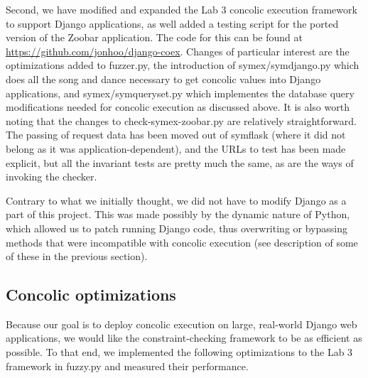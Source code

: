\documentclass{scrartcl}
\begin{document}
Second, we have modified and expanded the Lab 3 concolic execution framework to
support Django applications, as well added a testing script for the ported
version of the Zoobar application. The code for this can be found at
\url{https://github.com/jonhoo/django-coex}. Changes of particular interest are
the optimizations added to fuzzer.py, the introduction of symex/symdjango.py
which does all the song and dance necessary to get concolic values into Django
applications, and symex/symqueryset.py which implementes the database query
modifications needed for concolic execution as discussed above. It is also
worth noting that the changes to check-symex-zoobar.py are relatively
straightforward. The passing of request data has been moved out of symflask
(where it did not belong as it was application-dependent), and the URLs to test
has been made explicit, but all the invariant tests are pretty much the same,
as are the ways of invoking the checker.

Contrary to what we initially thought, we did not have to modify Django as a
part of this project. This was made possibly by the dynamic nature of Python,
which allowed us to patch running Django code, thus overwriting or bypassing
methods that were incompatible with concolic execution (see description of some
of these in the previous section).

\subsection{Concolic optimizations}

Because our goal is to deploy concolic execution on large, real-world
Django web applications, we would like the constraint-checking framework
to be as efficient as possible. To that end, we implemented the
following optimizations to the Lab 3 framework in fuzzy.py and measured
their performance.
\end{document}
